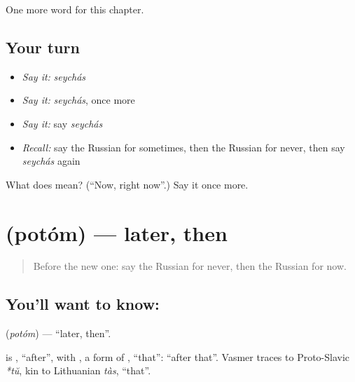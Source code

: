 \begin{grammarlens}[title={What you've built}]
One more word for this chapter.
\end{grammarlens}

\subsection*{Your turn}
\begin{itemize}
\raggedright
  \item \emph{Say it:} \emph{seychás}
  \item \emph{Say it:} \emph{seychás}, once more
  \item \emph{Say it:} say \emph{seychás}
  \item \emph{Recall:} say the Russian for sometimes, then the Russian for never, then say \emph{seychás} again
\end{itemize}

\begin{tcolorbox}[breakable,colback=teal!4,colframe=teal!35!black,title={Before you move on}]
What does  mean? (\textquotedblleft{}Now, right now\textquotedblright{}.) Say it once more.
\end{tcolorbox}
\section[\texorpdfstring{\ru{потом} (potóm)}{потом (potóm)}]{ (potóm) — later, then}

\label{lesson:RU-C74-later}



\begin{quote}
Before the new one: say the Russian for never, then the Russian for now.
\end{quote}

\subsection*{You'll want to know: }
\textbf{} (\emph{potóm}) — \textquotedblleft{}later, then\textquotedblright{}.

\begin{cousinweb}
\textbf{} is \emph{}, \textquotedblleft{}after\textquotedblright{}, with \emph{}, a form of \emph{}, \textquotedblleft{}that\textquotedblright{}: \textquotedblleft{}after that\textquotedblright{}. Vasmer traces \emph{} to Proto-Slavic \emph{*tŭ}, kin to Lithuanian \emph{tàs}, \textquotedblleft{}that\textquotedblright{}.
\end{cousinweb}

